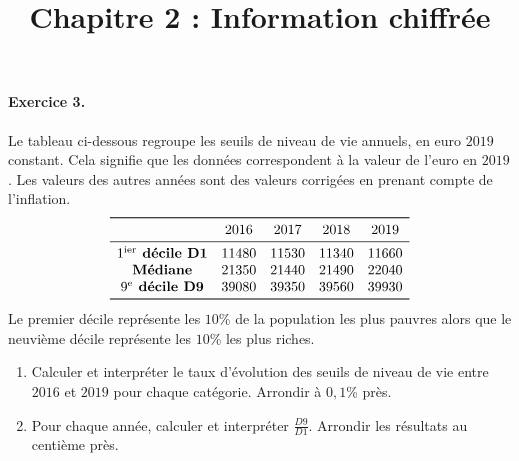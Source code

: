 \documentclass[11pt]{article}
\title{Chapitre 2 : Information chiffrée}
\date{}
\author{}
\begin{document}

\paragraph{Exercice 3.}
Le tableau ci-dessous regroupe les seuils de niveau de vie annuels, en euro
$2019$ constant. Cela signifie que les données correspondent à la valeur de
l'euro en $2019$. Les valeurs des autres années sont des valeurs corrigées en
prenant compte de l'inflation.
\[
\begin{array}[]{ccccc}
  \toprule
 & 2016 &  2017 & 2018 & 2019 \\ \midrule
 1^{\text{ier}}\text{\textbf{ décile D1}} & 11480 & 11530 & 11340 & 11660 \\
 \text{\textbf{Médiane}} & 21350 & 21440 & 21490 & 22040 \\
 9^{\text{e}}\text{\textbf{ décile D9}} & 39080 & 39350 & 39560 & 39930 \\
 \bottomrule
\end{array}
\]
Le premier décile représente les $10$\% de la population les plus pauvres alors
que le neuvième décile représente les $10$\% les plus riches.
\begin{enumerate}
  \item Calculer et interpréter le taux d'évolution des seuils de niveau de vie
    entre $2016$ et $2019$ pour chaque catégorie. Arrondir à $0,1$\% près.
  \item Pour chaque année, calculer et interpréter $\frac{D9}{D1}$. Arrondir les
    résultats au centième près.
\end{enumerate}
\end{document}
